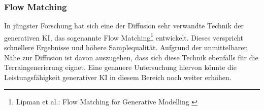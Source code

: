 \subsubsection{Flow Matching}

In jüngster Forschung hat sich eine der Diffusion sehr verwandte Technik der generativen \ac{KI}, das sogenannte Flow Matching\footnote{
    Lipman et al.: Flow Matching for Generative Modelling
    \cite{lipman2023flowmatchinggenerativemodeling}
} entwickelt. Dieses verspricht schnellere Ergebnisse und höhere Samplequalität. Aufgrund der unmittelbaren Nähe zur Diffusion ist davon auszugehen, dass sich diese Technik ebenfalls für die Terraingenerierung eignet. Eine genauere Untersuchung hiervon könnte die Leistungsfähigkeit generativer \ac{KI} in diesem Bereich noch weiter erhöhen.  